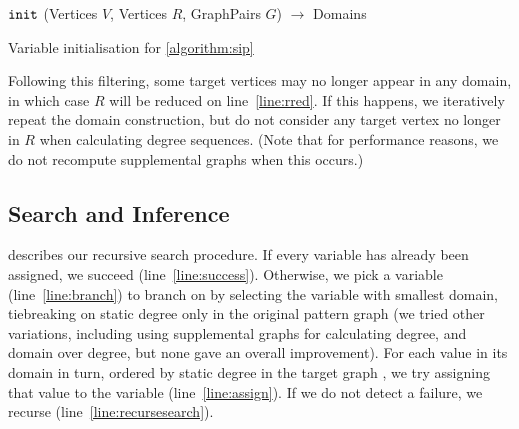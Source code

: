 \documentclass{llncs}
\newcommand{\lineref}[1]{line~\ref{#1}}
\begin{document}
\begin{algorithm}[h]
\DontPrintSemicolon
\nl $\FuncSty{init}$ (Vertices $V$, Vertices $R$, GraphPairs $G$) $\rightarrow$ Domains \;
\nl {}
\caption{Variable initialisation for \cref{algorithm:sip}}
\label{algorithm:init}
\end{algorithm}

Following this filtering, some target vertices may no longer appear in any domain, in which case $R$
will be reduced on \lineref{line:rred}. If this happens, we iteratively repeat the domain
construction, but do not consider any target vertex no longer in $R$ when calculating degree
sequences. (Note that for performance reasons, we do not recompute supplemental graphs when this
occurs.)

\subsection{Search and Inference}

 describes our recursive search procedure. If every variable has already been
assigned, we succeed (\lineref{line:success}). Otherwise, we pick a variable (\lineref{line:branch})
to branch on by selecting the variable with smallest domain, tiebreaking on static degree only in
the original pattern graph (we tried other variations, including using supplemental graphs for
calculating degree, and domain over degree, but none gave an overall improvement).  For each value
in its domain in turn, ordered by static degree in the target graph \cite{Geelen:1992}, we try
assigning that value to the variable (\lineref{line:assign}). If we do not detect a failure, we
recurse (\lineref{line:recursesearch}).
\end{document}
